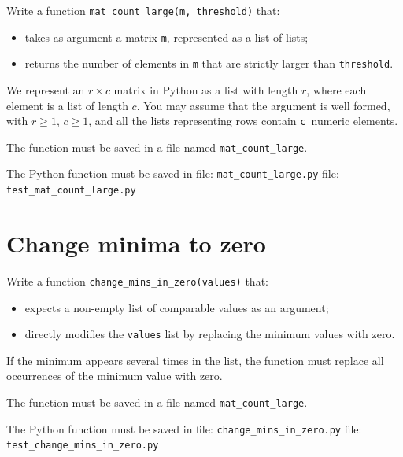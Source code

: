 Write a function \texttt{mat\_count\_large(m,\ threshold)} that:

\begin{itemize}
\tightlist
\item
  takes as argument a matrix \texttt{m}, represented as a list of lists;
\item
  returns the number of elements in \texttt{m} that are strictly larger
  than \texttt{threshold}.
\end{itemize}

We represent an \(r \times c\) matrix in Python as a list with length
\(r\), where each element is a list of length \(c\). You may assume that
the argument is well formed, with \(r \geq 1\), \(c \geq 1\), and all
the lists representing rows contain \texttt{c}~numeric elements.

The function must be saved in a file named \texttt{mat\_count\_large}.

The Python function must be saved in file: \texttt{mat\_count\_large.py}
\Test file: \texttt{test\_mat\_count\_large.py}

\pagebreak

\section{Change minima to zero}\label{change-minima-to-zero}

Write a function \texttt{change\_mins\_in\_zero(values)} that:

\begin{itemize}
\tightlist
\item
  expects a non-empty list of comparable values as an argument;
\item
  directly modifies the \texttt{values} list by replacing the minimum
  values with zero.
\end{itemize}

If the minimum appears several times in the list, the function must
replace all occurrences of the minimum value with zero.

The function must be saved in a file named \texttt{mat\_count\_large}.

The Python function must be saved in file:
\texttt{change\_mins\_in\_zero.py} \Test file:
\texttt{test\_change\_mins\_in\_zero.py}
